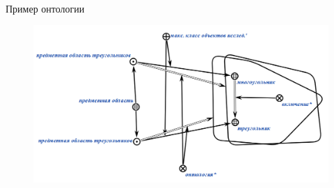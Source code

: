 \begin{frame}{\\Пример онтологии}
	\topline
	\justifying 
	\begin{figure}[H]
		\includegraphics[scale=0.35]{./figures/sd_ontologies/ontology3.png}
	\end{figure}
\end{frame}
